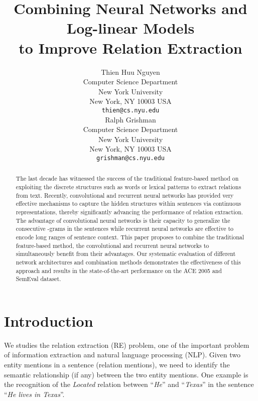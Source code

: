 \documentclass[11pt,letterpaper]{article}
\title{Combining Neural Networks and Log-linear Models \\ to Improve Relation Extraction}
\author{Thien Huu Nguyen \\
  Computer Science Department \\
  New York University \\
  New York, NY 10003 USA \\
  {\tt thien@cs.nyu.edu} \\\And
  Ralph Grishman \\
  Computer Science Department \\
  New York University \\
  New York, NY 10003 USA \\
  {\tt grishman@cs.nyu.edu} \\}
\date{}
\begin{document}
\maketitle

\begin{abstract}

The last decade has witnessed the success of the traditional feature-based method on exploiting the discrete structures such as words or lexical patterns to extract relations from text. Recently, convolutional and recurrent neural networks has provided very effective mechanisms to capture the hidden structures within sentences via continuous representations, thereby significantly advancing the performance of relation extraction. The advantage of convolutional neural networks is their capacity to generalize the consecutive -grams in the sentences while recurrent neural networks are effective to encode long ranges of sentence context. This paper proposes to combine the traditional feature-based method, the convolutional and recurrent neural networks to simultaneously benefit from their advantages. Our systematic evaluation of different network architectures and combination methods  demonstrates the effectiveness of this approach and results in the state-of-the-art performance on the ACE 2005 and SemEval dataset.

\end{abstract}

\section{Introduction}

We studies the relation extraction (RE) problem, one of the important problem of information extraction and natural language processing (NLP). Given two entity mentions in a sentence (relation mentions), we need to identify the semantic relationship (if any) between the two entity mentions. One example is the recognition of the {\it Located} relation between ``{\it He}'' and ``{\it Texas}'' in the sentence ``{\it He lives in Texas}''.
\end{document}
